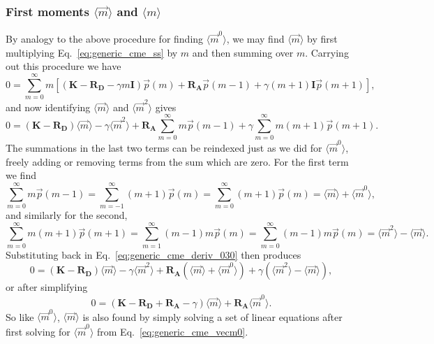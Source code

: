 \subsubsection{First moments $\langle\vec{m}\rangle$ and $\langle{m}\rangle$}
By analogy to the above procedure for finding $\langle\vec{m}^0\rangle$, we may
find $\langle\vec{m}\rangle$ by first multiplying Eq.~\ref{eq:generic_cme_ss} by
$m$ and then summing over $m$. Carrying out this procedure we have
\begin{equation}
0 = \sum_{m=0}^\infty m \left[
\left( \mathbf{K} - \mathbf{R_D} - \gamma m \mathbf{I} \right) \vec{p}(m)
            + \mathbf{R_A} \vec{p}(m-1) +
            \gamma (m+1) \mathbf{I} \vec{p}(m+1)
\right],
\end{equation}
and now identifying $\langle\vec{m}\rangle$ and $\langle\vec{m}^2\rangle$ gives
\begin{equation}
0 = (\mathbf{K} - \mathbf{R_D}) \langle\vec{m}\rangle
    - \gamma \langle\vec{m}^2\rangle + \mathbf{R_A} \sum_{m=0}^\infty m\vec{p}(m-1)
    + \gamma \sum_{m=0}^\infty m(m+1)\vec{p}(m+1).
\label{eq:generic_cme_deriv_030}
\end{equation}
The summations in the last two terms can be reindexed just as we did for
$\langle\vec{m}^0\rangle$, freely adding or removing terms from the sum which
are zero. For the first term we find
\begin{equation}
\sum_{m=0}^\infty m\vec{p}(m-1)
= \sum_{m=-1}^\infty (m+1)\vec{p}(m)
= \sum_{m=0}^\infty (m+1)\vec{p}(m)
= \langle\vec{m}\rangle + \langle\vec{m}^0\rangle,
\end{equation}
and similarly for the second,
\begin{equation}
\sum_{m=0}^\infty m(m+1)\vec{p}(m+1)
= \sum_{m=1}^\infty (m-1)m\vec{p}(m)
= \sum_{m=0}^\infty (m-1) m\vec{p}(m)
= \langle\vec{m}^2\rangle - \langle\vec{m}\rangle.
\end{equation}
Substituting back in Eq.~\ref{eq:generic_cme_deriv_030} then produces
\begin{equation}
0 = (\mathbf{K} - \mathbf{R_D}) \langle\vec{m}\rangle
- \gamma \langle\vec{m}^2\rangle
+ \mathbf{R_A} (\langle\vec{m}\rangle + \langle\vec{m}^0\rangle)
+ \gamma (\langle\vec{m}^2\rangle - \langle\vec{m}\rangle),
\end{equation}
or after simplifying
\begin{equation}
0 = (\mathbf{K} - \mathbf{R_D} + \mathbf{R_A} - \gamma) \langle\vec{m}\rangle
+ \mathbf{R_A} \langle\vec{m}^0\rangle.
\label{eq:generic_cme_deriv_040}
\end{equation}
So like $\langle\vec{m}^0\rangle$, $\langle\vec{m}\rangle$ is also found by
simply solving a set of linear equations after first solving for
$\langle\vec{m}^0\rangle$ from Eq.~\ref{eq:generic_cme_vecm0}.

